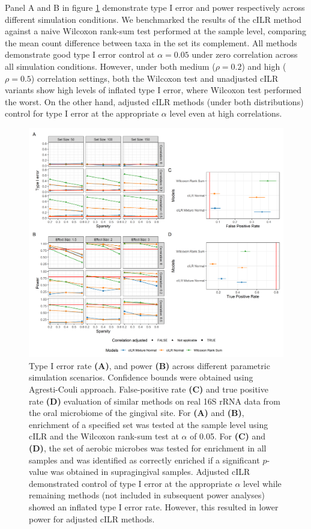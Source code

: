 \documentclass{article}
\begin{document}
Panel A and B in figure \ref{fig:ss_hypo} demonstrate type I error and power respectively across different simulation conditions. We benchmarked the results of the cILR method against a naive Wilcoxon rank-sum test performed at the sample level, comparing the mean count difference between taxa in the set its complement. All methods demonstrate good type I error control at $\alpha = 0.05$ under zero correlation across all simulation conditions. However, under both medium ($\rho = 0.2$) and high ($\rho = 0.5$) correlation settings, both the Wilcoxon test and unadjusted cILR variants show high levels of inflated type I error, where Wilcoxon test performed the worst. On the other hand, adjusted cILR methods (under both distributions) control for type I error at the appropriate $\alpha$ level even at high correlations. 

\begin{figure}[H]
    \centering
    \includegraphics[width=\textwidth]{figures/sim_data_ss_hypo.png}
    \caption{Type I error rate \textbf{(A)}, and power \textbf{(B)} across different parametric simulation scenarios. Confidence bounds were obtained using Agresti-Couli \cite{agresti1998} approach. False-positive rate \textbf{(C)} and true positive rate \textbf{(D)} evaluation of similar methods on real 16S rRNA data from the oral microbiome of the gingival site. For \textbf{(A)} and \textbf{(B)}, enrichment of a specified set was tested at the sample level using cILR and the Wilcoxon rank-sum test at $\alpha$ of 0.05. For \textbf{(C)} and \textbf{(D)}, the set of aerobic microbes was tested for enrichment in all samples and was identified as correctly enriched if a significant $p$-value was obtained in supragingival samples. Adjusted cILR demonstrated control of type I error at the appropriate $\alpha$ level while remaining methods (not included in subsequent power analyses) showed an inflated type I error rate. However, this resulted in lower power for adjusted cILR methods.}
    \label{fig:ss_hypo}
\end{figure}
\end{document}
